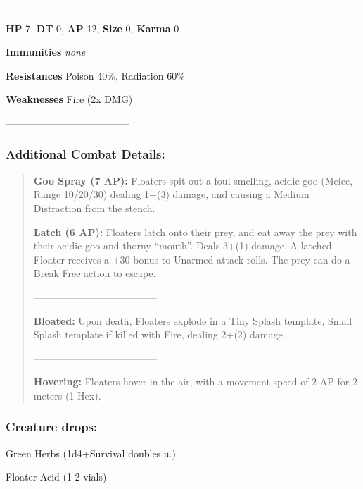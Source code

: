 \documentclass[11pt,a4paper,twocolumn]{book}
\begin{document}
	--------------------------------------
	
	\noindent
	\textbf{HP} 7, \textbf{DT} 0, \textbf{AP} 12, \textbf{Size} 0, \textbf{Karma} 0
	
	
	\noindent
	\textbf{Immunities} \emph{none} %
	
	\noindent
	\textbf{Resistances} Poison 40\%, Radiation 60\% %
	
	\noindent
	\textbf{Weaknesses} Fire (2x DMG) %
	
	--------------------------------------
	
	\subsubsection*{Additional Combat Details:}
	\begin{verse}
		\textbf{Goo Spray (7 AP):} Floaters spit out a foul-smelling, acidic goo (Melee, Range 10/20/30) dealing 1+(3) damage, and causing a Medium Distraction from the stench. 
		
		\textbf{Latch (6 AP):} Floaters latch onto their prey, and eat away the prey with their acidic goo and thorny ``mouth''. Deals 3+(1) damage. A latched Floater receives a +30 bonus to Unarmed attack rolls. The prey can do a Break Free action to escape.
		
		--------------------------------------
		
		\textbf{Bloated:} Upon death, Floaters explode in a Tiny Splash template, Small Splash template if killed with Fire, dealing 2+(2) damage.
		
		--------------------------------------
		
		\textbf{Hovering:} Floaters hover in the air, with a movement speed of 2 AP for 2 meters (1 Hex).
		
	\end{verse}
	
	\subsubsection*{Creature drops:}
	\begin{compactitem}
		\item Green Herbs (1d4+Survival doubles u.)
		\item Floater Acid (1-2 vials)
	\end{compactitem}
	
\end{document}
